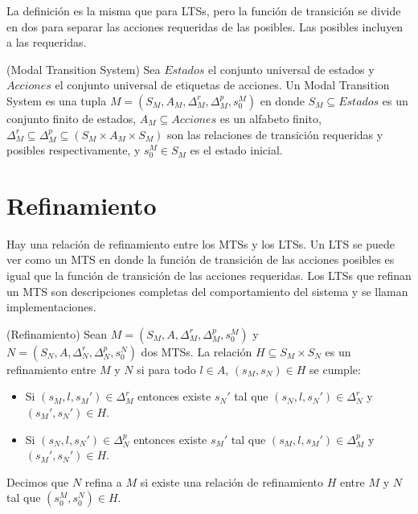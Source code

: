 \vspace{\baselineskip}
La definición es la misma que para LTSs, pero la función de transición se divide en dos para separar las acciones
requeridas de las posibles. Las posibles incluyen a las requeridas.

\begin{definition}{(Modal Transition System)}
Sea $Estados$ el conjunto universal de estados y $Acciones$ el conjunto universal de etiquetas de acciones. Un Modal
Transition System es una tupla $M = (S_{M}, A_{M}, \Delta_{M}^{r}, \Delta_{M}^{p}, s_{0}^{M})$ en donde $S_{M} \subseteq Estados$
es un conjunto finito de estados, $A_{M} \subseteq Acciones$ es un alfabeto finito, 
$\Delta_{M}^{r} \subseteq \Delta_{M}^{p} \subseteq (S_{M} \times A_{M} \times S_{M})$ son las relaciones de transición requeridas
y posibles respectivamente, y $s_{0}^{M} \in S_{M}$ es el estado inicial.
\end{definition}

\section{Refinamiento}
Hay una relación de refinamiento entre los MTSs y los LTSs. Un LTS se puede ver como un MTS en donde la función de
transición de las acciones posibles es igual que la función de transición de las acciones requeridas. Los LTSs que
refinan un MTS son descripciones completas del comportamiento del sistema y se llaman implementaciones.

\begin{definition}{(Refinamiento)}
Sean $M = (S_{M}, A, \Delta_{M}^{r}, \Delta_{M}^{p}, s_{0}^{M})$ y\\
$N = (S_{N}, A, \Delta_{N}^{r}, \Delta_{N}^{p}, s_{0}^{N})$ dos MTSs. La relación $H \subseteq S_{M} \times S_{N}$ es un refinamiento
entre $M$ y $N$ si para todo $l \in A$, $(s_{M}, s_{N}) \in H$ se cumple:

\begin{itemize}

\item
Si $(s_{M}, l, s_{M}') \in \Delta_{M}^{r}$ entonces existe $s_{N}'$ tal que $(s_{N}, l, s_{N}') \in \Delta_{N}^{r}$ y $(s_{M}', s_{N}') \in H$.

\item
Si $(s_{N}, l, s_{N}') \in \Delta_{N}^{p}$ entonces existe $s_{M}'$ tal que $(s_{M}, l, s_{M}') \in \Delta_{M}^{p}$ y $(s_{M}', s_{N}') \in H$.

\end{itemize}

Decimos que $N$ refina a $M$ si existe una relación de refinamiento $H$ entre $M$ y $N$ tal que $(s_{0}^{M}, s_{0}^{N}) \in H$.

\end{definition}

